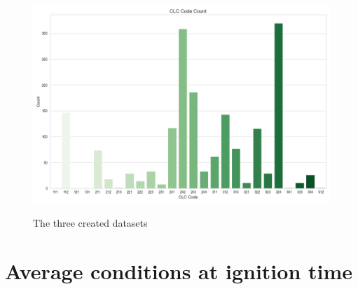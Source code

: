 \begin{figure}[H]
	\caption{The three created datasets}
	\centering
	\includegraphics[width=\textwidth]{chapter-images/5_1-eda/clc_code_count.png}
	\label{fig:montly_fire_count}
\end{figure}


\section{Average conditions at ignition time}


